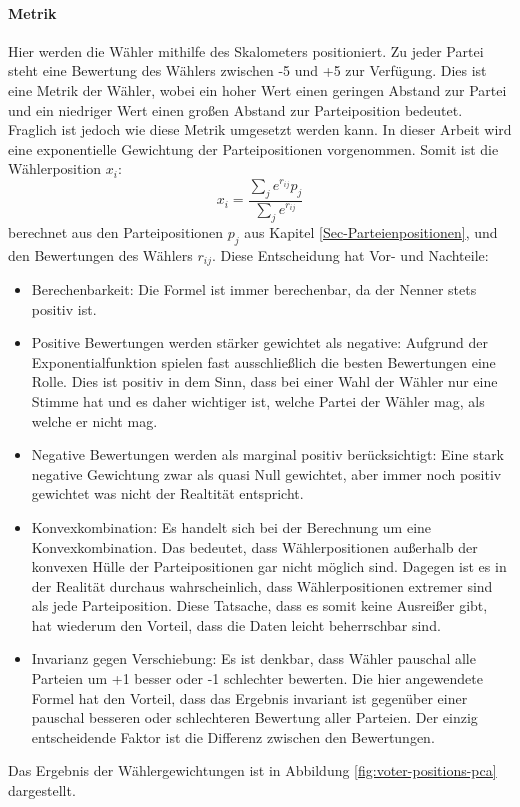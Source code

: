 \paragraph{Metrik}
Hier werden die Wähler mithilfe des Skalometers positioniert. Zu jeder Partei steht eine Bewertung des Wählers zwischen -5 und +5 zur Verfügung. Dies ist eine Metrik der Wähler, wobei ein hoher Wert einen geringen Abstand zur Partei und ein niedriger Wert einen großen Abstand zur Parteiposition bedeutet.
Fraglich ist jedoch wie diese Metrik umgesetzt werden kann. In dieser Arbeit wird eine exponentielle Gewichtung der Parteipositionen vorgenommen. Somit ist die Wählerposition $x_i$:
\begin{equation}
	x_i = \frac{\sum_j e^{r_{ij}} p_j}{\sum_j e^{r_{ij}}}
\end{equation}
berechnet aus den Parteipositionen $p_j$ aus Kapitel \ref{Sec-Parteienpositionen}, und den Bewertungen des Wählers $r_{ij}$.
Diese Entscheidung hat Vor- und Nachteile:
\begin{itemize}
	\item Berechenbarkeit: Die Formel ist immer berechenbar, da der Nenner stets positiv ist.
	\item Positive Bewertungen werden stärker gewichtet als negative: Aufgrund der Exponentialfunktion spielen fast ausschließlich die besten Bewertungen eine Rolle. Dies ist positiv in dem Sinn, dass bei einer Wahl der Wähler nur eine Stimme hat und es daher wichtiger ist, welche Partei der Wähler mag, als welche er nicht mag.
	\item Negative Bewertungen werden als marginal positiv berücksichtigt: Eine stark negative Gewichtung zwar als quasi Null gewichtet, aber immer noch positiv gewichtet was nicht der Realtität entspricht.
	\item Konvexkombination: Es handelt sich bei der Berechnung um eine Konvexkombination. Das bedeutet, dass Wählerpositionen außerhalb der konvexen Hülle der Parteipositionen gar nicht möglich sind. Dagegen ist es in der Realität durchaus wahrscheinlich, dass Wählerpositionen extremer sind als jede Parteiposition. Diese Tatsache, dass es somit keine Ausreißer gibt, hat wiederum den Vorteil, dass die Daten leicht beherrschbar sind.
	\item Invarianz gegen Verschiebung: Es ist denkbar, dass Wähler pauschal alle Parteien um +1 besser oder -1 schlechter bewerten. Die hier angewendete Formel hat den Vorteil, dass das Ergebnis invariant ist gegenüber einer pauschal besseren oder schlechteren Bewertung aller Parteien. Der einzig entscheidende Faktor ist die Differenz zwischen den Bewertungen.
\end{itemize}
Das Ergebnis der Wählergewichtungen ist in Abbildung \ref{fig:voter-positions-pca} dargestellt.

